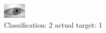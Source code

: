 \begin{figure}[h!]
\begin{center}
\includegraphics[width=0.60\columnwidth]{figures/ID2728_class_2_target_1.png}
\end{center}
\caption{ Classification: 2 actual target: 1}
\label{fig:ID2728_class_2_target_1}
\end{figure}

